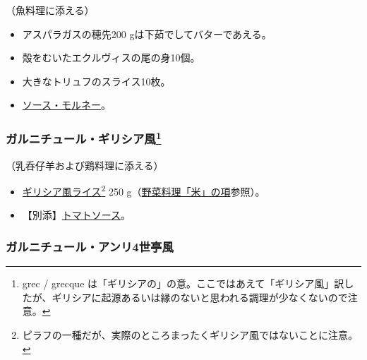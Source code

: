 \begin{recette}
（魚料理に添える）

\begin{itemize}
\item
  アスパラガスの穂先200 gは下茹でしてバターであえる。
\item
  殻をむいたエクルヴィスの尾の身10個。
\item
  大きなトリュフのスライス10枚。
\item
  \protect\hyperlink{sauce-mornay}{ソース・モルネー}。
\end{itemize}

\atoaki{}

\hypertarget{garniture-grecque}{%
\subsubsection[ガルニチュール・ギリシア風]{\texorpdfstring{ガルニチュール・ギリシア風\footnote{grec
  / grecque
  は「ギリシアの」の意。ここではあえて「ギリシア風」訳したが、ギリシアに起源あるいは縁のないと思われる調理が少なくないので注意。}}{ガルニチュール・ギリシア風}}\label{garniture-grecque}}



（乳呑仔羊および鶏料理に添える）

\begin{itemize}
\item
  \protect\hyperlink{riz-grecque}{ギリシア風ライス}\footnote{ピラフの一種だが、実際のところまったくギリシア風ではないことに注意。}
  250 g（\protect\hyperlink{riz}{野菜料理「米」の項}参照）。
\item
  【別添】\protect\hyperlink{sauce-tomate}{トマトソース}。
\end{itemize}

\atoaki{}

\hypertarget{garniture-henri-iv}{%
\subsubsection{ガルニチュール・アンリ4世亭風}\label{garniture-henri-iv}}


\end{recette}

